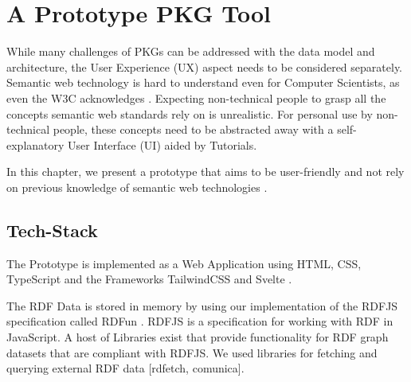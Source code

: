 \chapter{A Prototype PKG Tool} \label{ch:prototype}

While many challenges of PKGs can be addressed with the data model and architecture, the User Experience (UX) aspect needs to be considered separately. Semantic web technology is hard to understand even for Computer Scientists, as even the W3C acknowledges \cite{EasierRDF}. Expecting non-technical people to grasp all the concepts semantic web standards rely on is unrealistic. For personal use by non-technical people, these concepts need to be abstracted away with a self-explanatory User Interface (UI) aided by Tutorials. 

In this chapter, we present a prototype that aims to be user-friendly and not rely on previous knowledge of semantic web technologies \cite{missingCitation}.

\section{Tech-Stack}

The Prototype is implemented as a Web Application using HTML, CSS, TypeScript and the Frameworks TailwindCSS and Svelte \cite{missingCitation}. 

The RDF Data is stored in memory by using our implementation of the RDFJS specification called RDFun \cite{rdfjs}. RDFJS is a specification for working with RDF in JavaScript. A host of Libraries exist that provide functionality for RDF graph datasets that are compliant with RDFJS. We used libraries for fetching and querying external RDF data \cite{missingCitation} [rdfetch, comunica].

